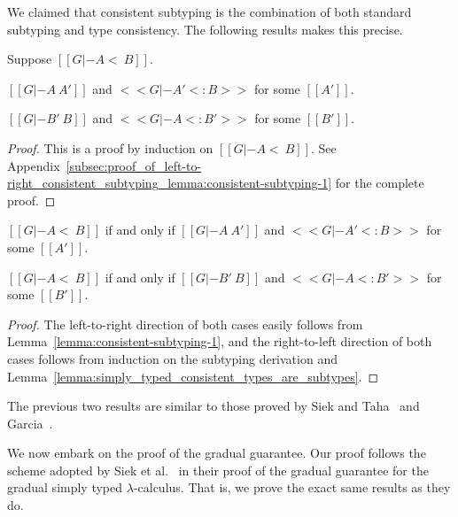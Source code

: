 We claimed that consistent subtyping is the combination of both
standard subtyping and type consistency. The following results makes
this precise. 
\begin{lemma}
  \label{lemma:consistent-subtyping-1}
  Suppose $[[G |- A <~ B]]$.
  \begin{enumR}
    \item $[[G |- A ~ A']]$ and $<<G |- A' <: B>>$ for some $[[A']]$.
    \item $[[G |- B' ~ B]]$ and $<<G |- A <: B'>>$ for some $[[B']]$.
  \end{enumR}   
\end{lemma}
\begin{proof}
  This is a proof by induction on $[[G |- A <~ B]]$.  See
  Appendix~\ref{subsec:proof_of_left-to-right_consistent_subtyping_lemma:consistent-subtyping-1}
  for the complete proof.
\end{proof}
\begin{corollary}
  \label{corollary:consistent_subtyping}
  \begin{enumR}
  \item $[[G |- A <~ B]]$ if and only if $[[G |- A ~ A']]$ and $<<G |- A' <: B>>$ for some $[[A']]$.
  \item $[[G |- A <~ B]]$ if and only if $[[G |- B' ~ B]]$ and $<<G |- A <: B'>>$ for some $[[B']]$.
  \end{enumR}
\end{corollary}
\begin{proof}
  The left-to-right direction of both cases easily follows from
  Lemma~\ref{lemma:consistent-subtyping-1}, and the right-to-left
  direction of both cases follows from induction on the subtyping
  derivation and Lemma~\ref{lemma:simply_typed_consistent_types_are_subtypes}.
\end{proof}
The previous two results are similar to those proved by Siek and
Taha~\cite{Siek:2007} and Garcia~\cite{Garcia:2016}.

We now embark on the proof of the gradual guarantee.  Our proof
follows the scheme adopted by Siek et al.~\cite{Siek:2015} in their
proof of the gradual guarantee for the gradual simply typed
$\lambda$-calculus.  That is, we prove the exact same results as they
do.

